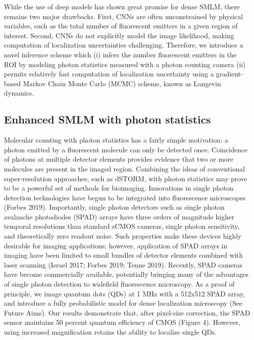 \documentclass{ucetd}
\begin{document}
While the use of deep models has shown great promise for dense SMLM, there remains two major drawbacks. First, CNNs are often unconstrained by physical variables, such as the total number of fluorescent emitters in a given region of interest. Second, CNNs do not explicitly model the image likelihood, making computation of localization uncertainties challenging. Therefore, we introduce a novel inference scheme which (i) infers the number fluorescent emitters in the ROI by modeling photon statistics measured with a photon counting camera (ii) permits relatively fast computation of localization uncertainty using a gradient-based Markov Chain Monte Carlo (MCMC) scheme, known as Langevin dynamics.

\subsection{Enhanced SMLM with photon statistics}

Molecular counting with photon statistics has a fairly simple motivation: a photon emitted by a fluorescent molecule can only be detected once. Coincidence of photons at multiple detector elements provides evidence that two or more molecules are present in the imaged region. Combining the ideas of conventional super-resolution approaches, such as dSTORM, with photon statistics may prove to be a powerful set of methods for bioimaging. Innovations in single photon detection technologies have begun to be integrated into fluorescence microscopes (Forbes 2019). Importantly, single photon detectors such as single photon avalanche photodiodes (SPAD) arrays have three orders of magnitude higher temporal resolutions than standard sCMOS cameras, single photon sensitivity, and theoretically zero readout noise. Such properties make these devices highly desirable for imaging applications; however, application of SPAD arrays in imaging have been limited to small bundles of detector elements combined with laser scanning (Israel 2017; Forbes 2019; Tenne 2019). Recently, SPAD cameras have become commercially available, potentially bringing many of the advantages of single photon detection to widefield fluorescence microscopy. As a proof of principle, we image quantum dots (QDs) at 1 MHz with a 512x512 SPAD array, and introduce a fully probabilistic model for dense localization microscopy (See Future Aims). Our results demonstrate that, after pixel-size correction, the SPAD sensor maintains 50 percent quantum efficiency of CMOS (Figure 4). However, using increased magnification retains the ability to localize single QDs.
\end{document}
